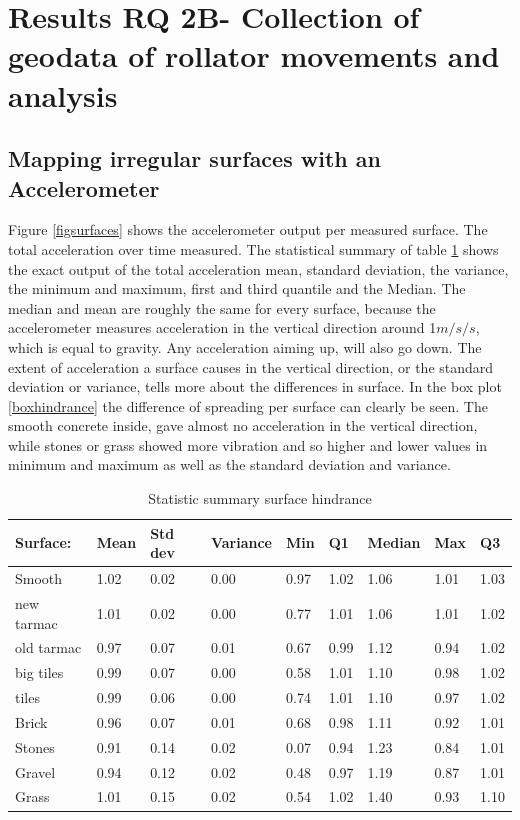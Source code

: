 \section{Results RQ 2B- Collection of geodata of rollator movements and analysis
}
\subsection{Mapping irregular surfaces with an Accelerometer}

Figure \ref{figsurfaces} shows the accelerometer output per measured surface. The total acceleration over time measured. The statistical summary of table \ref{surfacehindrance} shows the exact output of the total acceleration mean, standard deviation, the variance, the minimum and maximum, first and third quantile and the Median. The median and mean are roughly the same for every surface, because the accelerometer measures acceleration in the vertical direction around 1$m/s/s$, which is equal to gravity. Any acceleration aiming up, will also go down. The extent of acceleration a surface causes in the vertical direction, or the standard deviation or variance, tells more about the differences in surface.
In the box plot \ref{boxhindrance} the difference of spreading per surface can clearly be seen. The smooth concrete inside, gave almost no acceleration in the vertical direction, while stones or grass showed more vibration and so higher and lower values in minimum and maximum as well as the standard deviation and variance.   

\begin{table}[ht]
\caption{Statistic summary surface hindrance \label{surfacehindrance}}
\centering
\begin{tabular}{|l|l|l|l|l|l|l|l|l|}
\hline
Surface: & Mean & Std dev & Variance & Min & Q1 & Median & Max & Q3\\
\hline
Smooth & 1.02 & 0.02 & 0.00 & 0.97 & 1.02  & 1.06 & 1.01 & 1.03 \\
new tarmac  & 1.01  & 0.02  & 0.00  & 0.77  & 1.01  & 1.06 & 1.01  & 1.02\\
old tarmac & 0.97 & 0.07 & 0.01 & 0.67 & 0.99 & 1.12 & 0.94 & 1.02\\
big tiles & 0.99 & 0.07 & 0.00 & 0.58 & 1.01 & 1.10 & 0.98 & 1.02\\
tiles & 0.99 & 0.06 & 0.00 & 0.74 & 1.01 & 1.10 & 0.97 & 1.02\\
Brick & 0.96 & 0.07 & 0.01 & 0.68 & 0.98 & 1.11 & 0.92 & 1.01\\
Stones & 0.91 & 0.14 & 0.02 & 0.07 & 0.94 & 1.23 & 0.84 & 1.01\\
Gravel & 0.94 & 0.12 & 0.02 & 0.48 & 0.97 & 1.19 & 0.87 & 1.01\\
Grass & 1.01 & 0.15 & 0.02 & 0.54 & 1.02 & 1.40 & 0.93 & 1.10\\
\hline
\end{tabular}
\end{table}

